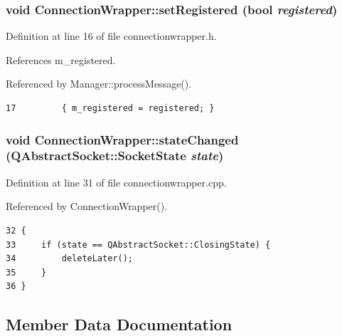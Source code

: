 \subsubsection{\setlength{\rightskip}{0pt plus 5cm}void ConnectionWrapper::setRegistered (bool {\em registered})\hspace{0.3cm}{\tt  [inline]}}\label{classConnectionWrapper_36e0d4469596bdcb91584e6c84abf89d}




Definition at line 16 of file connectionwrapper.h.

References m\_\-registered.

Referenced by Manager::processMessage().

\begin{Code}\begin{verbatim}17         { m_registered = registered; }
\end{verbatim}
\end{Code}


\subsubsection{\setlength{\rightskip}{0pt plus 5cm}void ConnectionWrapper::stateChanged (QAbstractSocket::SocketState {\em state})\hspace{0.3cm}{\tt  [protected, slot]}}\label{classConnectionWrapper_7a6381d23292b89f2c4902952c384556}




Definition at line 31 of file connectionwrapper.cpp.

Referenced by ConnectionWrapper().

\begin{Code}\begin{verbatim}32 {
33     if (state == QAbstractSocket::ClosingState) {
34         deleteLater();
35     }
36 }
\end{verbatim}
\end{Code}




\subsection{Member Data Documentation}
